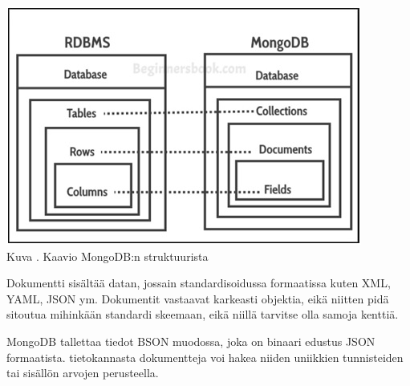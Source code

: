 \bigskip
\includegraphics{src/public/oppar/mongodb-structure.jpg} \\
Kuva \getImgCount. Kaavio MongoDB:n struktuurista
\medskip


Dokumentti sisältää datan, jossain standardisoidussa formaatissa kuten XML, YAML, JSON ym.
Dokumentit vastaavat karkeasti objektia, eikä niitten pidä sitoutua mihinkään standardi skeemaan, 
eikä niillä tarvitse olla samoja kenttiä.
\medskip


MongoDB tallettaa tiedot BSON muodossa, joka on binaari edustus JSON formaatista.
tietokannasta dokumentteja voi hakea niiden uniikkien tunnisteiden tai sisällön arvojen perusteella.
\medskip



